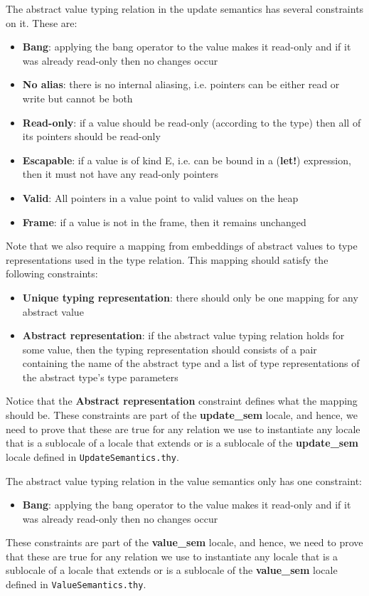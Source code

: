 \documentclass{article}
\begin{document}
The abstract value typing relation in the update semantics has several
constraints on it.
These are:
\begin{itemize}
\item \textbf{Bang}: applying the bang operator to the value makes it
read-only and if it was already read-only then no changes occur
\item \textbf{No alias}: there is no internal aliasing, i.e. pointers can
be either read or write but cannot be both
\item \textbf{Read-only}: if a value should be read-only (according to the
type) then all of its pointers should be read-only
\item \textbf{Escapable}: if a value is of kind E, i.e. can be bound in a
(\textbf{let!}) expression, then it must not have any read-only pointers
\item \textbf{Valid}: All pointers in a value point to valid values on the heap
\item \textbf{Frame}: if a value is not in the frame, then it remains unchanged
\end{itemize}
Note that we also require a mapping from embeddings of abstract values to
type representations used in the type relation.
This mapping should satisfy the following constraints:
\begin{itemize}
\item \textbf{Unique typing representation}: there should only be one
mapping for any abstract value
\item \textbf{Abstract representation}: if the abstract value typing
relation holds for some value,
then the typing representation should consists of a pair containing the
name of the abstract type and a list of type representations of the
abstract type's type parameters
\end{itemize}
Notice that the \textbf{Abstract representation} constraint defines what
the mapping should be.
These constraints are part of the \textbf{update\_sem} locale, and hence, 
we need to prove that these are true for any relation we use to instantiate
any locale that is a sublocale of a locale that extends or is a sublocale
of the \textbf{update\_sem} locale defined in \verb!UpdateSemantics.thy!.

The abstract value typing relation in the value semantics only has one
constraint:
\begin{itemize}
\item \textbf{Bang}: applying the bang operator to the value makes it
read-only and if it was already read-only then no changes occur
\end{itemize}
These constraints are part of the \textbf{value\_sem} locale, and hence, 
we need to prove that these are true for any relation we use to instantiate
any locale that is a sublocale of a locale that extends or is a sublocale
of the \textbf{value\_sem} locale defined in \verb!ValueSemantics.thy!.
\end{document}
